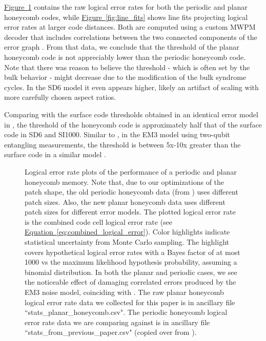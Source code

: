 \documentclass[onecolumn,unpublished,a4paper]{quantumarticle}
\theoremstyle{definition}
\theoremstyle{definition}
\theoremstyle{definition}
\newcommand{\eq}[1]{\hyperref[eq:#1]{Equation~\ref*{eq:#1}}}
\newcommand{\fig}[1]{\hyperref[fig:#1]{Figure~\ref*{fig:#1}}}
\begin{document}
\fig{thresholds} contains the raw logical error rates for both the periodic and planar honeycomb codes, while \fig{line_fits} shows line fits projecting logical error rates at larger code distances.
Both are computed using a custom MWPM decoder that includes correlations between the two connected components of the error graph \cite{gidney2021honeycombmemory, fowler2013optimal}. 
From that data, we conclude that the threshold of the planar honeycomb code is not appreciably lower than the periodic honeycomb code.  
Note that there was reason to believe the threshold - which is often set by the bulk behavior - might decrease due to the modification of the bulk syndrome cycles.
In the SD6 model it even appears higher, likely an artifact of scaling with more carefully chosen aspect ratios.

Comparing with the surface code thresholds obtained in an identical error model in \cite{gidney2021honeycombmemory}, the threshold of the honeycomb code is approximately half that of the surface code in SD6 and SI1000.
Similar to \cite{gidney2021honeycombmemory}, in the EM3 model using two-qubit entangling measurements, the threshold is between 5x-10x greater than the surface code in a similar model \cite{chao2020optimization}.

\begin{figure}[ht!]
    \centering
    \caption{
    Logical error rate plots of the performance of a periodic and planar honeycomb memory.
    Note that, due to our optimizations of the patch shape, the old periodic honeycomb data (from \cite{gidney2021honeycombmemory}) uses different patch sizes.
    Also, the new planar honeycomb data uses different patch sizes for different error models.
    The plotted logical error rate is the combined code cell logical error rate (see \eq{combined_logical_error}).
    Color highlights indicate statistical uncertainty from Monte Carlo sampling.
    The highlight covers hypothetical logical error rates with a Bayes factor of at most 1000 vs the maximum likelihood hypothesis probability, assuming a binomial distribution.
    In both the planar and periodic cases, we see the noticeable effect of damaging correlated errors produced by the EM3 noise model, coinciding with \cite{gidney2021honeycombmemory}.
    The raw planar honeycomb logical error rate data we collected for this paper is in ancillary file ``stats\_planar\_honeycomb.csv".
    The periodic honeycomb logical error rate data we are comparing against is in ancillary file ``stats\_from\_previous\_paper.csv" (copied over from \cite{gidney2021honeycombmemory}).
    }
    \label{fig:thresholds}
\end{figure}
\end{document}
